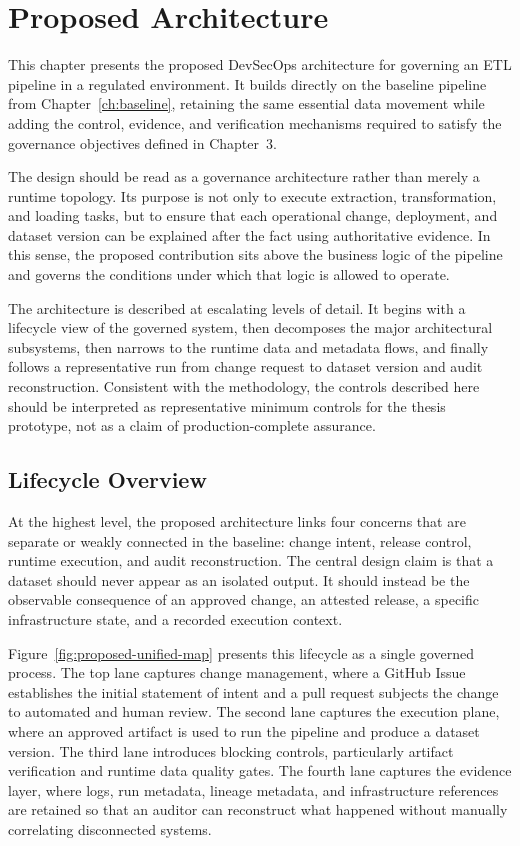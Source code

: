 \chapter{Proposed Architecture}
\label{ch:proposed-architecture}
\noindent
This chapter presents the proposed DevSecOps architecture for governing an
ETL pipeline in a regulated environment. It builds directly on the baseline
pipeline from Chapter~\ref{ch:baseline}, retaining the same essential data
movement while adding the control, evidence, and verification mechanisms
required to satisfy the governance objectives defined in Chapter~3.

The design should be read as a governance architecture rather than merely a
runtime topology. Its purpose is not only to execute extraction,
transformation, and loading tasks, but to ensure that each operational change,
deployment, and dataset version can be explained after the fact using
authoritative evidence. In this sense, the proposed contribution sits above the
business logic of the pipeline and governs the conditions under which that
logic is allowed to operate.

The architecture is described at escalating levels of detail. It begins with a
lifecycle view of the governed system, then decomposes the major architectural
subsystems, then narrows to the runtime data and metadata flows, and finally
follows a representative run from change request to dataset version and audit
reconstruction. Consistent with the methodology, the controls described here
should be interpreted as representative minimum controls for the thesis
prototype, not as a claim of production-complete assurance.

\section{Lifecycle Overview}
\noindent
At the highest level, the proposed architecture links four concerns that are
separate or weakly connected in the baseline: change intent, release control,
runtime execution, and audit reconstruction. The central design claim is that a
dataset should never appear as an isolated output. It should instead be the
observable consequence of an approved change, an attested release, a specific
infrastructure state, and a recorded execution context.

Figure~\ref{fig:proposed-unified-map} presents this lifecycle as a single
governed process. The top lane captures change management, where a GitHub Issue
establishes the initial statement of intent and a pull request subjects the
change to automated and human review. The second lane captures the execution
plane, where an approved artifact is used to run the pipeline and produce a
dataset version. The third lane introduces blocking controls, particularly
artifact verification and runtime data quality gates. The fourth lane captures
the evidence layer, where logs, run metadata, lineage metadata, and
infrastructure references are retained so that an auditor can reconstruct what
happened without manually correlating disconnected systems.

